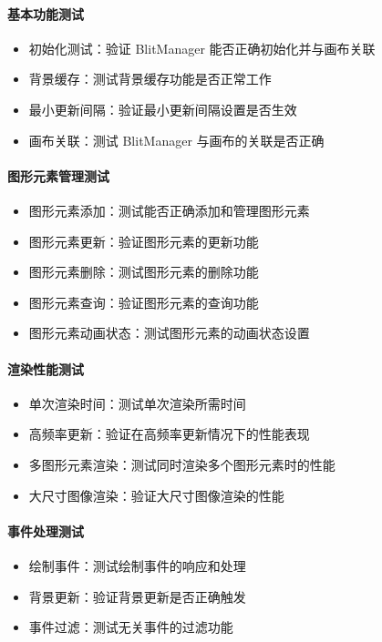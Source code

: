 \documentclass[a4paper,12pt]{report}	%
\begin{document}
\paragraph{基本功能测试}
\begin{itemize}
    \item 初始化测试：验证 BlitManager 能否正确初始化并与画布关联
    \item 背景缓存：测试背景缓存功能是否正常工作
    \item 最小更新间隔：验证最小更新间隔设置是否生效
    \item 画布关联：测试 BlitManager 与画布的关联是否正确
\end{itemize}

\paragraph{图形元素管理测试}
\begin{itemize}
    \item 图形元素添加：测试能否正确添加和管理图形元素
    \item 图形元素更新：验证图形元素的更新功能
    \item 图形元素删除：测试图形元素的删除功能
    \item 图形元素查询：验证图形元素的查询功能
    \item 图形元素动画状态：测试图形元素的动画状态设置
\end{itemize}

\paragraph{渲染性能测试}
\begin{itemize}
    \item 单次渲染时间：测试单次渲染所需时间
    \item 高频率更新：验证在高频率更新情况下的性能表现
    \item 多图形元素渲染：测试同时渲染多个图形元素时的性能
    \item 大尺寸图像渲染：验证大尺寸图像渲染的性能
\end{itemize}

\paragraph{事件处理测试}
\begin{itemize}
    \item 绘制事件：测试绘制事件的响应和处理
    \item 背景更新：验证背景更新是否正确触发
    \item 事件过滤：测试无关事件的过滤功能
\end{itemize}
\end{document}
